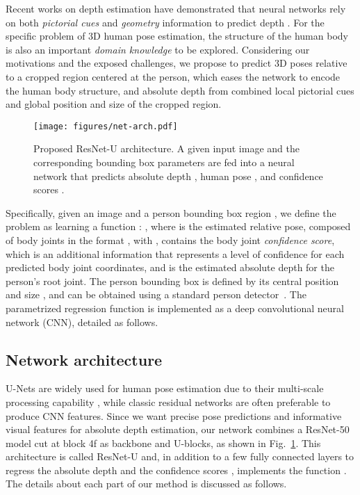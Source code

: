 \documentclass[10pt,twocolumn,letterpaper]{article}
\newcommand{\rev}[1]{#1}
\newcommand{\revb}[1]{{#1}}
\begin{document}
Recent works on depth estimation have demonstrated that neural networks rely on
both \textit{pictorial cues} and \textit{geometry} information to predict
depth \cite{Dijk_2019_ICCV}.
For the specific problem of 3D human pose estimation, the structure of the
human body is also an important \textit{domain knowledge} to be explored.
Considering our motivations and the exposed challenges, we propose to predict
3D poses relative to a cropped region \rev{centered at the person}, \rev{which
eases the network to encode the human body structure,} and absolute
depth from combined local pictorial cues and global position and size of
the cropped region.

\begin{figure}[ht]
  \centering
  \texttt{[image: figures/net-arch.pdf]}
  \caption{Proposed ResNet-U architecture. \revb{A given input image and
  the corresponding} bounding box parameters are fed into a neural network that predicts
  absolute depth , human pose , and confidence scores .
  }
  \label{fig:net-arch}
\end{figure}

Specifically, given an image 
and a person bounding box region , we define
the problem as learning a function :
,
where  is the estimated relative pose,
composed of  body joints in the format , with
,  contains the
\rev{body joint \textit{confidence score}}, which is an additional
information that represents \rev{a level of confidence for each predicted body
joint coordinates}, and  is the estimated absolute
depth for the person's root joint.
The person bounding box  is defined by its central position
 and size , and can be
obtained using a standard person detector~\cite{Redmon_2017_CVPR}.
The parametrized regression function 
is implemented as a deep convolutional neural network (CNN), detailed as
follows.

\subsection{Network architecture}

U-Nets are widely used for human pose estimation due to their multi-scale
processing capability \cite{Newell_ECCV_2016}, while classic residual networks \cite{he2016deep}
are often preferable to produce CNN features. Since we want precise pose
predictions and informative visual features for absolute depth estimation,
\revb{our network combines} a ResNet-50 model cut at block 4f as
backbone and U-blocks, as shown in Fig.~\ref{fig:net-arch}. This
architecture is called ResNet-U and, \rev{in addition to a few fully connected
layers to regress the absolute depth  and the confidence
scores ,} implements the function .
\rev{The details about each part of our method is discussed as follows.}
\end{document}
